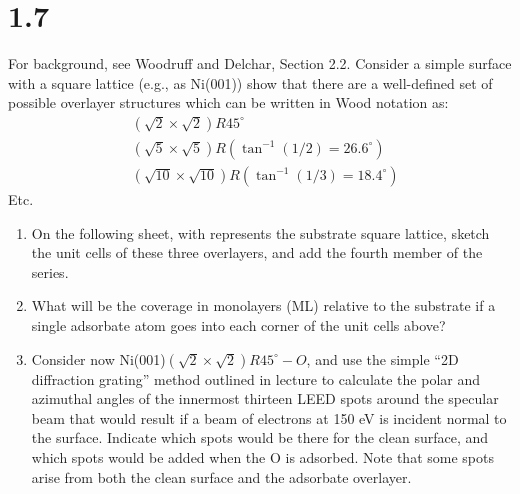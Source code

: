 \documentclass[12pt]{article}
\renewcommand{\=}[1]{\stackrel{#1}{=}} %
\theoremstyle{definition}
\theoremstyle{remark}
\begin{document}
\section*{1.7}
\begin{bclogo}[logo=\bcquestion , barre=none]
\newline
 For background, see Woodruff and Delchar, Section 2.2.
 \newline
Consider a simple surface with a square lattice (e.g., as Ni(001)) show that there are a well-defined set
of possible overlayer structures which can be written in Wood notation as:
\begin{align*}
&\left(\sqrt{2}\times\sqrt{2}\right)R45^\circ\\
&\left(\sqrt{5}\times\sqrt{5}\right)R(\tan^{-1}(1/2)=26.6^\circ)\\
&\left(\sqrt{10}\times\sqrt{10}\right)R(\tan^{-1}(1/3)=18.4^\circ)
\end{align*}
\center Etc.
\newline
\begin{enumerate}
\item On the following sheet, with represents the substrate square lattice, sketch the unit cells of these three overlayers, and add the fourth member of the series. 
\item What will be the coverage in monolayers (ML) relative to the substrate if a single adsorbate atom goes into each corner of the unit cells above? 
\item Consider now Ni(001)$\left(\sqrt{2}\times\sqrt{2}\right)R45^\circ-O$, and use the simple “2D diffraction grating” method
outlined in lecture to calculate the polar and azimuthal angles of the innermost thirteen LEED spots around the specular beam that would result if a beam of electrons at 150 eV is incident normal to the surface. Indicate which spots would be there for the clean surface, and which spots would be added when the O is adsorbed. Note that some spots arise from both the clean surface and the adsorbate overlayer.
\end{enumerate}
\end{bclogo}
\vspace{2cm}
\end{document}
